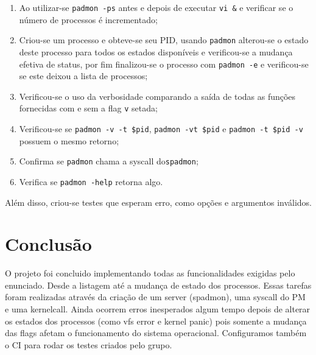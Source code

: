 \documentclass[12pt,journal,compsoc]{IEEEtran}
\begin{document}
\begin{enumerate}
\item Ao utilizar-se \texttt{padmon -ps} antes e depois de executar \texttt{vi \&} e verificar se o número de processos é incrementado;
\item Criou-se um processo e obteve-se seu PID, usando \texttt{padmon} alterou-se o estado deste processo para todos os estados disponíveis e verificou-se a mudança efetiva de status, por fim finalizou-se o processo com \texttt{padmon -e} e verificou-se se este deixou a lista de processos;
\item Verificou-se o uso da verbosidade comparando a saída de todas as funções fornecidas com e sem a flag \texttt{v} setada;
\item Verificou-se se \texttt{padmon -v -t \$pid}, \texttt{padmon -vt \$pid} e \texttt{padmon -t \$pid -v} possuem o mesmo retorno;
\item Confirma se \texttt{padmon} chama a syscall do\texttt{spadmon};
\item Verifica se \texttt{padmon -help} retorna algo.
\end{enumerate}

Além disso, criou-se testes que esperam erro, como opções e argumentos inválidos.

\section{Conclusão}
O projeto foi concluido implementando todas as funcionalidades exigidas pelo enunciado. Desde a listagem até a mudança de estado dos processos. Essas tarefas foram realizadas através da criação de um server (spadmon), uma syscall do PM e uma kernelcall. Ainda ocorrem erros inesperados algum tempo depois de alterar os estados dos processos (como vfs error e kernel panic) pois somente a mudança das flags afetam o funcionamento do sistema operacional. Configuramos também o CI para rodar os testes criados pelo grupo.
\end{document}

